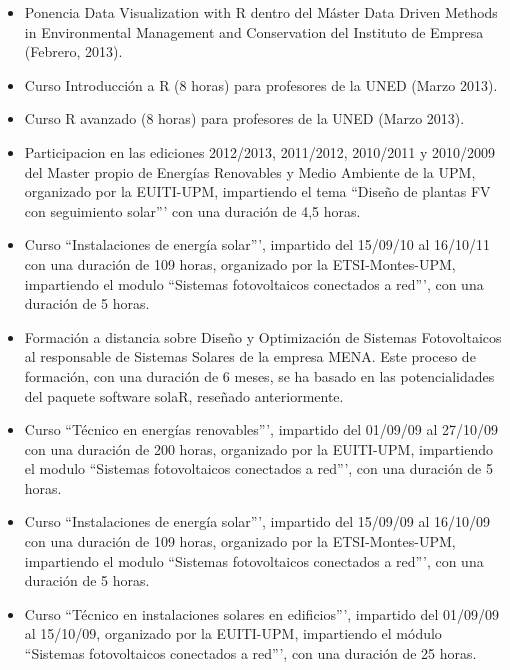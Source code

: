 \documentclass[article, a4paper]{memoir}
\begin{document}
\begin{itemize}
\item Ponencia \guillemotleft{}Data Visualization with R\guillemotright{} dentro del Máster \guillemotleft{}Data Driven
Methods in Environmental Management and Conservation\guillemotright{} del Instituto
de Empresa (Febrero, 2013).

\item Curso \guillemotleft{}Introducción a R\guillemotright{} (8 horas) para profesores de la UNED (Marzo
2013).

\item Curso \guillemotleft{}R avanzado\guillemotright{} (8 horas) para profesores de la UNED (Marzo
2013).

\item Participacion en las ediciones 2012/2013, 2011/2012, 2010/2011 y 2010/2009 del Master
propio de Energías Renovables y Medio Ambiente de la UPM,
organizado por la EUITI-UPM, impartiendo el tema ``Diseño de
plantas FV con seguimiento solar''' con una duración de 4,5
horas.

\item Curso ``Instalaciones de energía solar''', impartido del 15/09/10
al 16/10/11 con una duración de 109 horas, organizado por la
ETSI-Montes-UPM, impartiendo el modulo ``Sistemas fotovoltaicos
conectados a red''', con una duración de 5 horas.

\item Formación a distancia sobre Diseño y Optimización de Sistemas
Fotovoltaicos al responsable de Sistemas Solares de la empresa
MENA. Este proceso de formación, con una duración de 6 meses,
se ha basado en las potencialidades del paquete software solaR,
reseñado anteriormente.

\item Curso ``Técnico en energías renovables''', impartido del 01/09/09
al 27/10/09 con una duración de 200 horas, organizado por la
EUITI-UPM, impartiendo el modulo ``Sistemas fotovoltaicos
conectados a red''', con una duración de 5 horas.

\item Curso ``Instalaciones de energía solar''', impartido del 15/09/09
al 16/10/09 con una duración de 109 horas, organizado por la
ETSI-Montes-UPM, impartiendo el modulo ``Sistemas fotovoltaicos
conectados a red''', con una duración de 5 horas.

\item Curso ``Técnico en instalaciones solares en edificios''',
impartido del 01/09/09 al 15/10/09, organizado por la
EUITI-UPM, impartiendo el módulo ``Sistemas fotovoltaicos
conectados a red''', con una duración de 25 horas.


\end{itemize}
\end{document}
